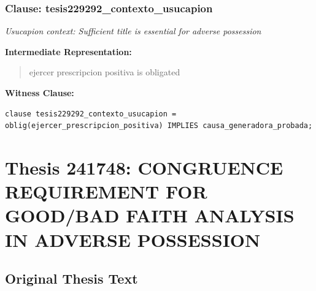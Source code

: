 \documentclass[11pt,a4paper]{article}
\begin{document}
\subsubsection{Clause: tesis229292\_contexto\_usucapion}

\textit{Usucapion context: Sufficient title is essential for adverse possession}

\textbf{Intermediate Representation:}

\begin{quote}
ejercer prescripcion positiva is obligated
\end{quote}

\textbf{Witness Clause:}

\begin{lstlisting}[style=witnessstyle, language=Witness]
clause tesis229292_contexto_usucapion = oblig(ejercer_prescripcion_positiva) IMPLIES causa_generadora_probada;
\end{lstlisting}

\newpage

\section{Thesis 241748: CONGRUENCE REQUIREMENT FOR GOOD/BAD FAITH ANALYSIS IN ADVERSE POSSESSION}
\label{thesis:241748}

\subsection{Original Thesis Text}
\end{document}
